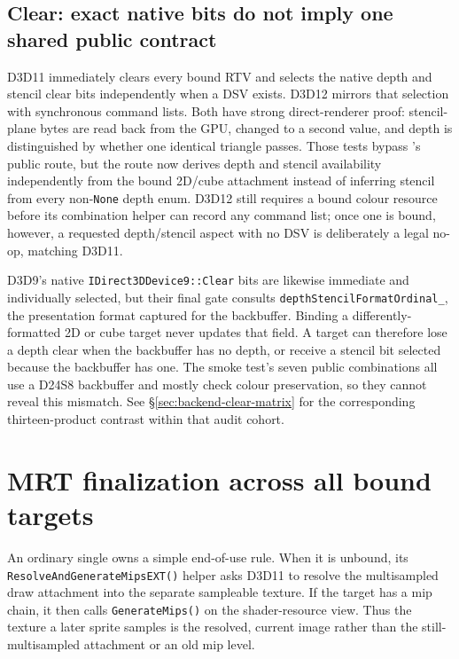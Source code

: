 \subsection{Clear: exact native bits do not imply one shared public contract}

D3D11 immediately clears every bound RTV and selects the native depth and stencil clear bits
independently when a DSV exists. D3D12 mirrors that selection with synchronous command lists.
Both have strong direct-renderer proof: stencil-plane bytes are read back from the GPU, changed to a second
value, and depth is distinguished by whether one identical triangle passes. Those tests bypass
's public route, but the route now derives depth and stencil availability
independently from the bound 2D/cube attachment instead of inferring stencil from every
non-\texttt{None} depth enum. D3D12 still requires a bound colour resource before its combination
helper can record any command list; once one is bound, however, a requested depth/stencil aspect
with no DSV is deliberately a legal no-op, matching D3D11.

D3D9's native \texttt{IDirect3DDevice9::Clear} bits are likewise immediate and individually
selected, but their final gate consults \texttt{depthStencilFormatOrdinal\_}, the presentation
format captured for the backbuffer. Binding a differently-formatted 2D or cube target never
updates that field. A target can therefore lose a depth clear when the backbuffer has no
depth, or receive a stencil bit selected because the backbuffer has one. The smoke test's seven
public combinations all use a D24S8 backbuffer and mostly check colour preservation, so they
cannot reveal this mismatch. See \S\ref{sec:backend-clear-matrix} for the corresponding
thirteen-product contrast within that audit cohort.

\section{MRT finalization across all bound targets}

An ordinary single  owns a simple end-of-use rule. When it is unbound,
its \texttt{ResolveAnd\allowbreak{}Generate\allowbreak{}MipsEXT()} helper asks D3D11 to resolve the
multisampled draw attachment into the separate sampleable texture. If the target
has a mip chain, it then calls \texttt{GenerateMips()} on the shader-resource view. Thus the
texture a later sprite samples is the resolved, current image rather than the still-multisampled
attachment or an old mip level.

